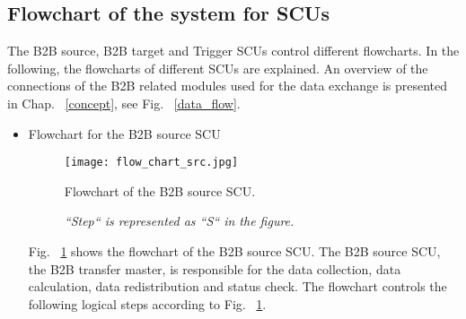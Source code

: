 \subsection{Flowchart of the system for SCUs}
\label{sec_firmware}
The B2B source, B2B target and Trigger SCUs control different flowcharts. In the following, the flowcharts of different SCUs are explained. An overview of the connections of the B2B related modules used for the data exchange is presented in Chap. ~\ref{concept}, see Fig. ~\ref{data_flow}.
\begin{itemize}
\item Flowchart for the B2B source SCU
\begin{figure}[!htb]
   \centering   
   \texttt{[image: flow\_chart\_src.jpg]}
   \caption{Flowchart of the B2B source SCU.}
   \caption*{\textsl{\small{``Step`` is represented as ``S`` in the figure.  }}}
   \label{flow_chart_src}
\end{figure}

Fig. ~\ref{flow_chart_src} shows the flowchart of the B2B source SCU. The B2B source SCU, the B2B transfer master, is responsible for the data collection, data calculation, data redistribution and status check. The flowchart controls the following logical steps according to Fig. ~\ref{flow_chart_src}.


\end{itemize}
